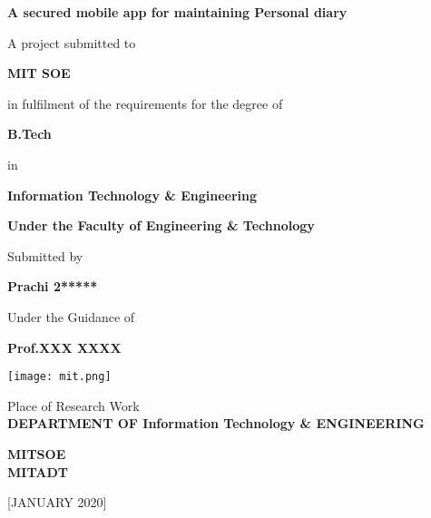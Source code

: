 \documentclass[12pt,a4paper]{report}
\begin{document}
\begin{titlepage}
	\centering
      	{\large \textbf{A secured mobile app for maintaining
Personal diary}\par}
      	\vspace{0.5cm}
	A project submitted to 
	
	\vspace{1cm}
	\graphicspath{ {F:/0/} }

	
	{\textbf{MIT SOE}\par}
	\vspace{0.5cm}
	in fulfilment of the requirements for the degree of\par
	\vspace{0.5cm}
	{\Large \textbf{B.Tech}\par}
	\vspace{0.5cm}
	in\par
	\textbf{Information Technology \& Engineering}\par
	\textbf{Under the Faculty of Engineering \& Technology}\par
	\vspace{2cm}
	 Submitted by\\
	{\Large \textbf{Prachi  2*****}\par}
	
	\vspace{1cm}
		
	\vspace{1.1cm}
	 Under the Guidance of\\
	{\Large \textbf{Prof.XXX XXXX}\par}
	
	\vspace{1.1cm}
	
	\texttt{[image: mit.png]}
		\vspace{1cm}   
	
	Place of Research Work\\
	\vspace{0.2cm}
	\textbf{DEPARTMENT OF Information Technology \& ENGINEERING}\par
	\textbf{MITSOE \\
	MITADT}

	\vspace{0.3cm}
	[JANUARY 2020]
	
\end{titlepage}
      	 





\captionsetup[table]{skip=10pt}
\end{document}
